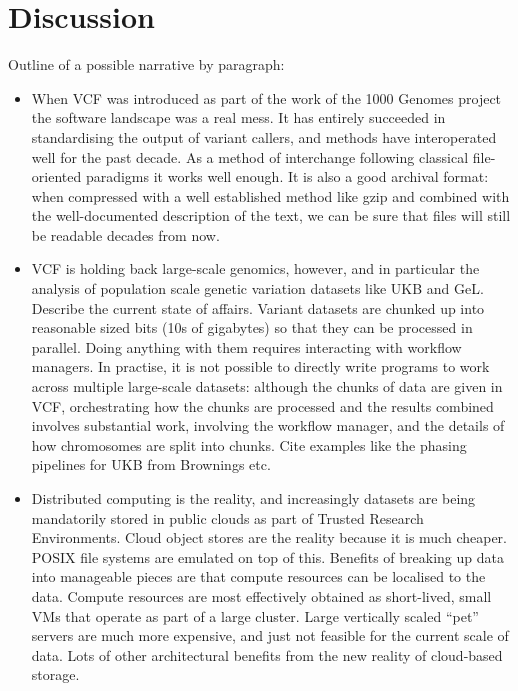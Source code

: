 \documentclass[a4paper,num-refs]{oup-contemporary}
\begin{document}
\section{Discussion}

Outline of a possible narrative by paragraph:
\begin{itemize}
\item When VCF was introduced as part of the work of the 1000 Genomes
project the software landscape was a real mess. It has entirely
succeeded in standardising the output of variant callers, and methods
have interoperated well for the past decade. As a method of interchange
following classical file-oriented paradigms it works well enough.
It is also a good archival format: when compressed with a well established
method like gzip and combined with the well-documented description of
the text, we can be sure that files will still be readable decades
from now.

\item VCF is holding back large-scale genomics, however, and in particular the
analysis of population scale genetic variation datasets like UKB and GeL.
Describe the current state of affairs. Variant datasets are chunked up
into reasonable sized bits (10s of gigabytes) so that they can be processed
in parallel. Doing anything with them requires interacting with workflow
managers. In practise, it is not possible to directly write programs to
work across multiple large-scale datasets: although the chunks of data
are given in VCF, orchestrating how the chunks are processed and
the results combined involves substantial work, involving the workflow
manager, and the details of how chromosomes are split into chunks.
Cite examples like the phasing pipelines for UKB from Brownings etc.

\item Distributed computing is the reality, and increasingly datasets
are being mandatorily stored in public clouds as part of
Trusted Research Environments. Cloud object stores are the reality
because it is much cheaper. POSIX file systems are emulated on top of
this. Benefits of breaking up data into manageable pieces are that
compute resources can be localised to the data. Compute resources are
most effectively obtained as short-lived, small VMs that operate
as part of a large cluster. Large vertically scaled ``pet'' servers
are much more expensive, and just not feasible for the current
scale of data. Lots of other architectural
benefits from the new reality of cloud-based storage.


\end{itemize}
\end{document}
